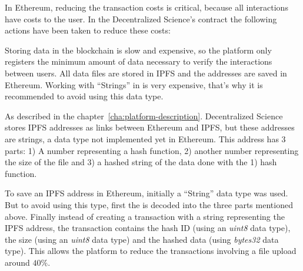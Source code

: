In Ethereum, reducing the transaction costs is critical, because all
interactions have costs to the user. In the Decentralized Science's contract the
following actions have been taken to reduce these costs:

\begin{itemize}
   Storing data in the
  blockchain is slow and expensive, so the platform only registers the minimum
  amount of data necessary to verify the interactions between users. All data
  files are stored in IPFS and the addresses are saved in Ethereum.  Working with ``Strings'' in  is very
  expensive, that's why it is recommended to avoid using this data type.

  As described in the chapter~\ref{cha:platform-description}. Decentralized
  Science stores IPFS addresses as links between Ethereum and IPFS, but these
  addresses are  strings, a data type not implemented yet in
  Ethereum. This address has 3 parts: 1) A number representing a hash function,
  2) another number representing the size of the file and 3) a hashed string of
  the data done with the 1) hash function.

  To save an IPFS address in Ethereum, initially a ``String'' data type was
  used. But to avoid using this type, first the  is decoded into the
  three parts mentioned above. Finally instead of creating a transaction with a
  string representing the IPFS address, the transaction contains the hash ID
  (using an \emph{uint8} data type), the size (using an \emph{uint8} data type)
  and the hashed data (using \emph{bytes32} data type). This allows the platform
  to reduce the transactions involving a file upload around $40\%$.
\end{itemize}

